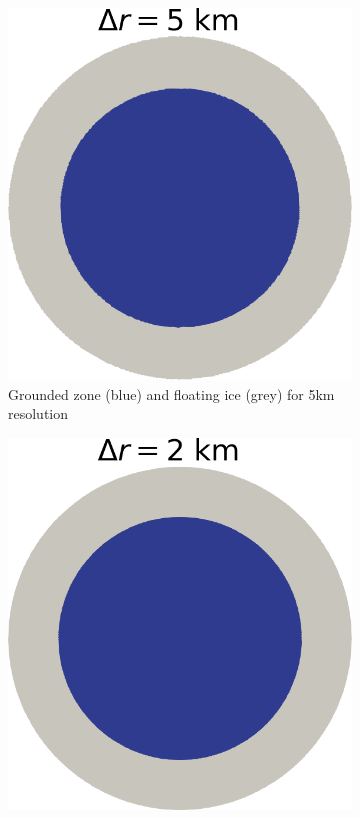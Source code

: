 \documentclass{article}
\begin{document}
\begin{figure}[!h]
	\medskip
	\begin{subfigure}{0.25\textwidth}
		\includegraphics[width=\linewidth]{../fig/Grounded_zone_5km_CONE.png}
		\caption{Grounded zone (blue) and floating ice (grey) for 5km resolution}
		\label{figCONE5}
	\end{subfigure}\hfil %
	\begin{subfigure}{0.25\textwidth}
		\includegraphics[width=\linewidth]{../fig/Grounded_zone_2km_CONE.png}

\end{subfigure}
\end{figure}
\end{document}
